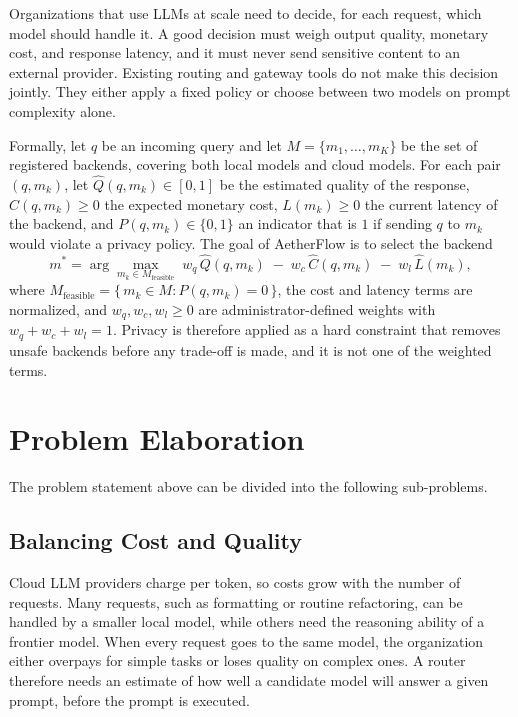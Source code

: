 Organizations that use LLMs at scale need to decide, for each request, which model should handle it. A good decision must weigh output quality, monetary cost, and response latency, and it must never send sensitive content to an external provider. Existing routing and gateway tools do not make this decision jointly. They either apply a fixed policy or choose between two models on prompt complexity alone.

Formally, let $q$ be an incoming query and let $M = \{m_1, \dots, m_K\}$ be the set of registered backends, covering both local models and cloud models. For each pair $(q, m_k)$, let $\hat{Q}(q, m_k) \in [0,1]$ be the estimated quality of the response, $C(q, m_k) \ge 0$ the expected monetary cost, $L(m_k) \ge 0$ the current latency of the backend, and $P(q, m_k) \in \{0,1\}$ an indicator that is $1$ if sending $q$ to $m_k$ would violate a privacy policy. The goal of AetherFlow is to select the backend
\begin{equation}
m^{*} = \arg\max_{m_k \in M_{\mathrm{feasible}}} \; w_q\,\hat{Q}(q, m_k) \; - \; w_c\,\hat{C}(q, m_k) \; - \; w_l\,\hat{L}(m_k),
\label{eq:objective}
\end{equation}
where $M_{\mathrm{feasible}} = \{\, m_k \in M : P(q, m_k) = 0 \,\}$, the cost and latency terms are normalized, and $w_q, w_c, w_l \ge 0$ are administrator-defined weights with $w_q + w_c + w_l = 1$. Privacy is therefore applied as a hard constraint that removes unsafe backends before any trade-off is made, and it is not one of the weighted terms.

\section{Problem Elaboration}
\label{sec:elaboration}

The problem statement above can be divided into the following sub-problems.

\subsection{Balancing Cost and Quality}
Cloud LLM providers charge per token, so costs grow with the number of requests. Many requests, such as formatting or routine refactoring, can be handled by a smaller local model, while others need the reasoning ability of a frontier model. When every request goes to the same model, the organization either overpays for simple tasks or loses quality on complex ones. A router therefore needs an estimate of how well a candidate model will answer a given prompt, before the prompt is executed.

